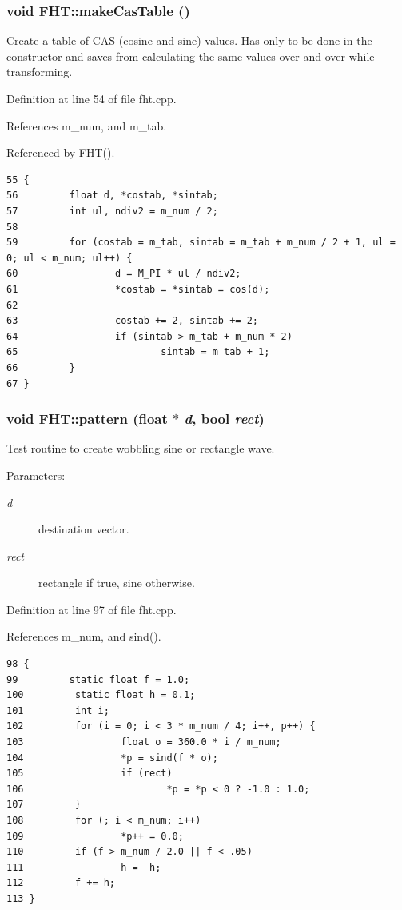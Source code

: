 \subsubsection{\setlength{\rightskip}{0pt plus 5cm}void FHT::make\-Cas\-Table ()\hspace{0.3cm}{\tt  [private]}}\label{classFHT_FHTd0}


Create a table of CAS (cosine and sine) values. Has only to be done in the constructor and saves from calculating the same values over and over while transforming.

Definition at line 54 of file fht.cpp.

References m\_\-num, and m\_\-tab.

Referenced by FHT().



\footnotesize\begin{verbatim}55 {
56         float d, *costab, *sintab;
57         int ul, ndiv2 = m_num / 2;
58 
59         for (costab = m_tab, sintab = m_tab + m_num / 2 + 1, ul = 0; ul < m_num; ul++) {
60                 d = M_PI * ul / ndiv2;
61                 *costab = *sintab = cos(d);
62 
63                 costab += 2, sintab += 2;
64                 if (sintab > m_tab + m_num * 2)
65                         sintab = m_tab + 1;
66         }
67 }
\end{verbatim}\normalsize 
{}
\subsubsection{\setlength{\rightskip}{0pt plus 5cm}void FHT::pattern (float $\ast$ {\em d}, bool {\em rect})}\label{classFHT_FHTa8}


Test routine to create wobbling sine or rectangle wave. \begin{Desc}
\item[Parameters:]
\begin{description}
\item[{\em d}]destination vector. \item[{\em rect}]rectangle if true, sine otherwise.\end{description}
\end{Desc}


Definition at line 97 of file fht.cpp.

References m\_\-num, and sind().



\footnotesize\begin{verbatim}98 {
99         static float f = 1.0;
100         static float h = 0.1;
101         int i;
102         for (i = 0; i < 3 * m_num / 4; i++, p++) {
103                 float o = 360.0 * i / m_num;
104                 *p = sind(f * o);
105                 if (rect)
106                         *p = *p < 0 ? -1.0 : 1.0;
107         }
108         for (; i < m_num; i++)
109                 *p++ = 0.0;
110         if (f > m_num / 2.0 || f < .05)
111                 h = -h;
112         f += h;
113 }
\end{verbatim}\normalsize 



